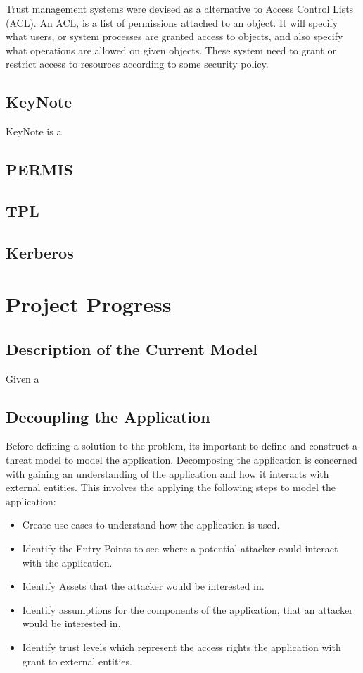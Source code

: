 \documentclass[11pt, a4paper, twoside, openany, notitlepage]{report}
\begin{document}
Trust management systems were devised as a alternative to Access Control Lists (ACL). An ACL, is a list of permissions attached to an object. It will specify what users, or system processes are granted access to objects, and also specify what operations are allowed on given objects. \cite{acl-rfc} These system need to grant or restrict access to resources according to some security policy. 

\section*{KeyNote}
KeyNote is a 
\section*{PERMIS}
\section*{TPL}
\section*{Kerberos}

\makeblankpage

\chapter{Project Progress}
\section*{Description of the Current Model}
Given a 



\section*{Decoupling the Application}
Before defining a solution to the problem, its important to define and construct a threat model to model the application. Decomposing the application is concerned with gaining an understanding of the application and how it interacts with external entities. This involves the applying the following steps to model the application:  

\begin{itemize}
  \item Create use cases to understand how the application is used.
  \item Identify the Entry Points to see where a potential attacker could interact with the application.
  \item Identify Assets that the attacker would be interested in.
  \item Identify assumptions for the components of the application, that an attacker would be interested in.
  \item Identify trust levels which represent the access rights the application with grant to external entities. 
\end{itemize}
\end{document}
